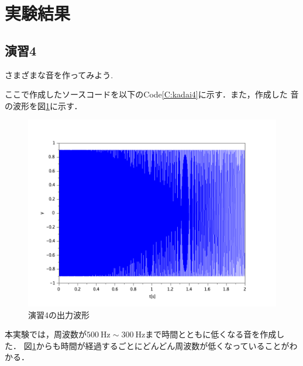 \documentclass[a4paper,11pt]{jsarticle}
\begin{document}
\section{実験結果}
\subsection{演習4}
\begin{screen}
  さまざまな音を作ってみよう.
\end{screen}
ここで作成したソースコードを以下のCode\ref{C:kadai4}に示す．また，作成した
音の波形を図\ref{G:kadai4}に示す．

\begin{figure}[H]
  \centering
  \includegraphics[width=0.8\linewidth]{picture/kadai4.png}
  \caption{演習4の出力波形}
  \label{G:kadai4}
\end{figure}
本実験では，周波数が$\SI{500}{\hertz} \sim \SI{300}{\hertz}$まで時間とともに低くなる音を作成した．
図\ref{G:kadai4}からも時間が経過するごとにどんどん周波数が低くなっていることがわかる．
\end{document}
